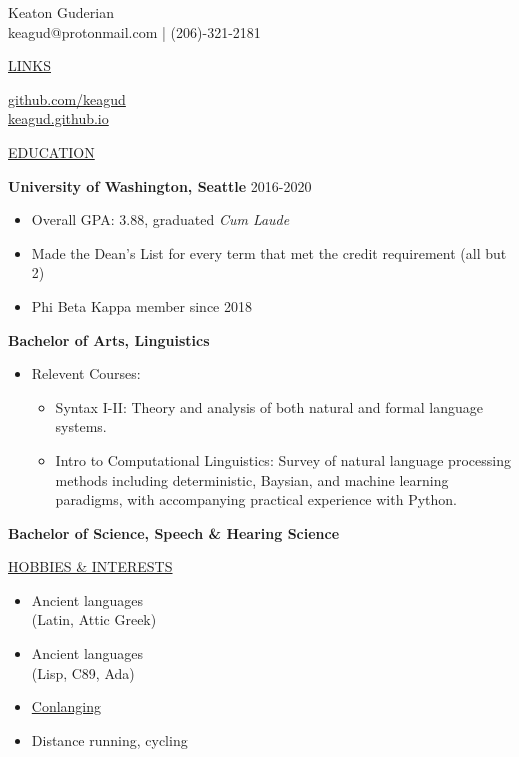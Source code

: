 \documentclass[11pt]{article}
\newcommand{\resumetitle}[3]{
    \AddToShipoutPictureBG{
        \AtPageUpperLeft {
        \raisebox{-0.09\paperheight}{
            \color{black!85}\rule{2\paperwidth}{\paperheight}}
        }}
    \begin{Center}
        \begingroup
        \titlethin
        \color{black!10}\Huge{#1}
        \titlethick
        \color{black!5}\Huge{#2} \\
        \vspace{2mm}
        \textrm{\color{black!15}\Large{#3}}
        \endgroup
    \end{Center}
    \vspace{7mm}
}
\newcommand{\betteruline}[1]{
    \uline{#1}
}
\newcommand{\sectiontitle}[1]{
    \begingroup
        \titlebold
        \betteruline{\Large\uppercase{#1}  }
        \vspace{1.7mm}
    \endgroup
}
\newcommand{\sectioncontent}[1]{
    \begingroup
        \begin{FlushLeft}
        \vspace{-3mm}
        \sffamily\small#1
        \end{FlushLeft}
    \endgroup
    \vspace{2mm}
}
\begin{document}
    \resumetitle{Keaton}{Guderian} {
      keagud@protonmail.com | (206)-321-2181
    }

    \setlength{\columnsep}{7mm}
    \begin{paracol}{2}

    \sectiontitle{links}
    \sectioncontent{
        \hspace{2mm}
        \href{https://github.com/keagud}{github.com/keagud} \\
        \faIcon{link}\hspace{1.8mm}
        \href{keagud.github.io}{keagud.github.io}
    }

    \sectiontitle{education}
    \sectioncontent{
        \begingroup
      \textbf{University of Washington, Seattle }\hfill\color{black!70}\small{2016-2020}
        \endgroup
      \begin{itemize}
      \item Overall GPA: 3.88, graduated \textit{Cum Laude}
      \item Made the Dean's List for every term that met the credit requirement (all but 2)
      \item Phi Beta Kappa member since 2018
        \end{itemize}
      \item \textbf{Bachelor of Arts, Linguistics }
        \begin{itemize}
          \item Relevent Courses: 
            \begin{itemize}
              \item Syntax I-II: Theory and analysis of both natural and formal language systems.
              \item Intro to Computational Linguistics: Survey of natural language processing methods including deterministic, Baysian, and machine learning paradigms, with accompanying practical experience with Python.
            \end{itemize}

        \end{itemize}
      \item \textbf{Bachelor of Science, Speech \& Hearing Science}
      } 

    \sectiontitle{Hobbies \& Interests}
    \sectioncontent{
      \begin{itemize}
        \item Ancient languages \\ (Latin, Attic Greek)
        \item Ancient languages \\  (Lisp, C89, Ada)
        \item \href{https://en.wikipedia.org/wiki/Constructed\_language}{Conlanging}
        \item Distance running, cycling


\end{itemize}}
\end{paracol}
\end{document}
